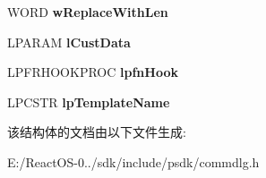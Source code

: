 \begin{DoxyCompactItemize}
W\+O\+RD {\bfseries w\+Replace\+With\+Len}
\item 
\mbox{\label{struct_f_i_n_d_r_e_p_l_a_c_e_a_a8e55f5236c4aab23c35960e73e32f5ea}} 
L\+P\+A\+R\+AM {\bfseries l\+Cust\+Data}
\item 
\mbox{\label{struct_f_i_n_d_r_e_p_l_a_c_e_a_a8a45dfa9d3095ebdc74c71ff3d29da01}} 
L\+P\+F\+R\+H\+O\+O\+K\+P\+R\+OC {\bfseries lpfn\+Hook}
\item 
\mbox{\label{struct_f_i_n_d_r_e_p_l_a_c_e_a_a72996631f87f621800495b1e0f9b83ff}} 
L\+P\+C\+S\+TR {\bfseries lp\+Template\+Name}
\end{DoxyCompactItemize}


该结构体的文档由以下文件生成\+:\begin{DoxyCompactItemize}
\item 
E\+:/\+React\+O\+S-\/0../sdk/include/psdk/commdlg.\+h\end{DoxyCompactItemize}
